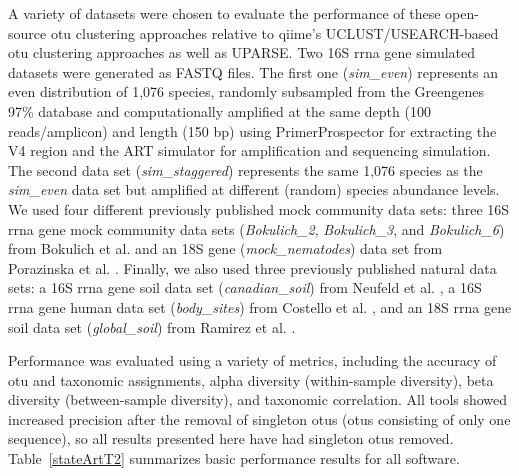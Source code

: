 A variety of datasets were chosen to evaluate the performance of these open-source
\gls{otu} clustering approaches relative to \gls{qiime}’s UCLUST/USEARCH-based
\gls{otu} clustering approaches as well as UPARSE. Two 16S \gls{rrna} gene simulated
datasets were generated as FASTQ files. The first one (\emph{sim\_even}) represents
an even distribution of 1,076 species, randomly subsampled from the Greengenes
97\% \cite{DeSantis2006, McDonald2012} database and computationally amplified at
the same depth (100 reads/amplicon) and length (150 \gls{bp}) using
PrimerProspector \cite{Walters2011} for extracting the V4 region and the ART \cite{Huang2012}
simulator for amplification and sequencing simulation. The second data set (\emph{sim\_staggered})
represents the same 1,076 species as the \emph{sim\_even} data set but amplified at
different (random) species abundance levels. We used four different previously published
mock community data sets: three 16S \gls{rrna} gene mock community data sets
(\emph{Bokulich\_2}, \emph{Bokulich\_3}, and \emph{Bokulich\_6}) from Bokulich
et al. \cite{Bokulich2013} and an 18S gene (\emph{mock\_nematodes}) data set from
Porazinska et al. \cite{Porazinska2009}. Finally, we also used three previously
published natural data sets: a 16S \gls{rrna} gene soil data set (\emph{canadian\_soil})
from Neufeld et al. \cite{Neufeld2011}, a 16S \gls{rrna} gene human data set (\emph{body\_sites})
from Costello et al. \cite{Costello2009}, and an 18S \gls{rrna} gene soil data set
(\emph{global\_soil}) from Ramirez et al. \cite{Ramirez2014}.

Performance was evaluated using a variety of metrics, including the accuracy of
\gls{otu} and taxonomic assignments, alpha diversity (within-sample diversity),
beta diversity (between-sample diversity), and taxonomic correlation. All tools
showed increased precision after the removal of singleton \gls{otu}s (\gls{otu}s
consisting of only one sequence), so all results presented here have had singleton
\gls{otu}s removed. Table~\ref{stateArtT2} summarizes basic performance results
for all software.


